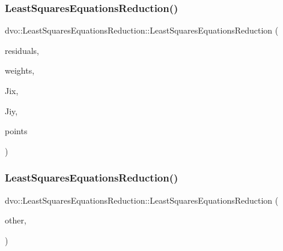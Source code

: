 \subsubsection{\texorpdfstring{Least\+Squares\+Equations\+Reduction()}{LeastSquaresEquationsReduction()}\hspace{0.1cm}{\footnotesize\ttfamily [1/2]}}
{\footnotesize\ttfamily dvo\+::\+Least\+Squares\+Equations\+Reduction\+::\+Least\+Squares\+Equations\+Reduction (\begin{DoxyParamCaption}\item[{const cv\+::\+Mat \&}]{residuals,  }\item[{const dvo\+::core\+::\+Weight\+Calculation \&}]{weights,  }\item[{const cv\+::\+Mat \&}]{Jix,  }\item[{const cv\+::\+Mat \&}]{Jiy,  }\item[{const dvo\+::core\+::\+Rgbd\+Image\+::\+Point\+Cloud \&}]{points }\end{DoxyParamCaption})\hspace{0.3cm}{\ttfamily [inline]}}

\mbox{\label{structdvo_1_1_least_squares_equations_reduction_a0d615509ae3ef7176e8f9504065de1b0}} 
\subsubsection{\texorpdfstring{Least\+Squares\+Equations\+Reduction()}{LeastSquaresEquationsReduction()}\hspace{0.1cm}{\footnotesize\ttfamily [2/2]}}
{\footnotesize\ttfamily dvo\+::\+Least\+Squares\+Equations\+Reduction\+::\+Least\+Squares\+Equations\+Reduction (\begin{DoxyParamCaption}\item[{\mbox{\hyperlink{structdvo_1_1_least_squares_equations_reduction}{Least\+Squares\+Equations\+Reduction}} \&}]{other,  }\item[{tbb\+::split}]{ }\end{DoxyParamCaption})\hspace{0.3cm}{\ttfamily [inline]}}

